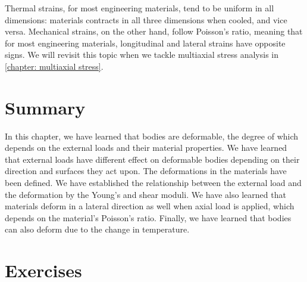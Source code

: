 \documentclass[
10pt,
a4paper,
openany,
svgnames,
]{book} %
\begin{document}
Thermal strains, for most engineering materials, tend to be uniform in all dimensions: materials contracts in all three dimensions when cooled, and vice versa. Mechanical strains, on the other hand, follow Poisson's ratio, meaning that for most engineering materials, longitudinal and lateral strains have opposite signs. We will revisit this topic when we tackle multiaxial stress analysis in \cref{chapter: multiaxial stress}.

\section*{Summary}

In this chapter, we have learned that bodies are deformable, the degree of which depends on the external loads and their material properties. We have learned that external loads have different effect on deformable bodies depending on their direction and surfaces they act upon. The deformations in the materials have been defined. We have established the relationship between the external load and the deformation by the Young’s and shear moduli. We have also learned that materials deform in a lateral direction as well when axial load is applied, which depends on the material’s Poisson’s ratio. Finally, we have learned that bodies can also deform due to the change in temperature.

\section*{Exercises}
\end{document}
